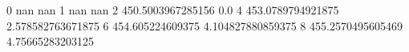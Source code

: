0 nan nan
1 nan nan
2 450.5003967285156 0.0
4 453.0789794921875 2.578582763671875
6 454.605224609375 4.104827880859375
8 455.2570495605469 4.75665283203125
